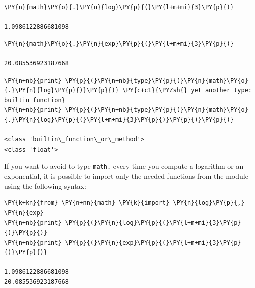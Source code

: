 \begin{codebox}[breakable, size=fbox, boxrule=1pt, pad at break*=1mm, colback=cellbackground, colframe=cellborder]            
\begin{Verbatim}[commandchars=\\\{\}]
\PY{n}{math}\PY{o}{.}\PY{n}{log}\PY{p}{(}\PY{l+m+mi}{3}\PY{p}{)}

1.0986122886681098
\end{Verbatim}
\end{codebox}

\begin{codebox}[breakable, size=fbox, boxrule=1pt, pad at break*=1mm, colback=cellbackground, colframe=cellborder]            
\begin{Verbatim}[commandchars=\\\{\}]
\PY{n}{math}\PY{o}{.}\PY{n}{exp}\PY{p}{(}\PY{l+m+mi}{3}\PY{p}{)}

20.085536923187668
\end{Verbatim}
\end{codebox}

\begin{codebox}[breakable, size=fbox, boxrule=1pt, pad at break*=1mm, colback=cellbackground, colframe=cellborder]            
\begin{Verbatim}[commandchars=\\\{\}]
\PY{n+nb}{print} \PY{p}{(}\PY{n+nb}{type}\PY{p}{(}\PY{n}{math}\PY{o}{.}\PY{n}{log}\PY{p}{)}\PY{p}{)} \PY{c+c1}{\PYZsh{} yet another type: builtin function}
\PY{n+nb}{print} \PY{p}{(}\PY{n+nb}{type}\PY{p}{(}\PY{n}{math}\PY{o}{.}\PY{n}{log}\PY{p}{(}\PY{l+m+mi}{3}\PY{p}{)}\PY{p}{)}\PY{p}{)}

<class 'builtin\_function\_or\_method'>
<class 'float'>
\end{Verbatim}
\end{codebox}

If you want to avoid to type \texttt{math.} every time you compute a logarithm or an exponential, 
it is possible to import only the needed functions from the module using the following syntax:

\begin{codebox}[breakable, size=fbox, boxrule=1pt, pad at break*=1mm, colback=cellbackground, colframe=cellborder]            
\begin{Verbatim}[commandchars=\\\{\}]
\PY{k+kn}{from} \PY{n+nn}{math} \PY{k}{import} \PY{n}{log}\PY{p}{,} \PY{n}{exp}
\PY{n+nb}{print} \PY{p}{(}\PY{n}{log}\PY{p}{(}\PY{l+m+mi}{3}\PY{p}{)}\PY{p}{)}
\PY{n+nb}{print} \PY{p}{(}\PY{n}{exp}\PY{p}{(}\PY{l+m+mi}{3}\PY{p}{)}\PY{p}{)}

1.0986122886681098
20.085536923187668
\end{Verbatim}
\end{codebox}

